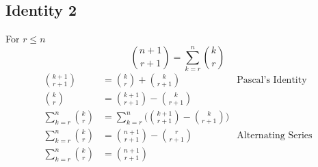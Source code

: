 \documentclass{article}
\theoremstyle{mytheoremstyle}
\theoremstyle{mytheoremstyle}
\theoremstyle{myproblemstyle}
\begin{document}
    \subsection*{Identity 2}
    For $r \le n$
    \[
        \binom{n+1}{r+1} = \sum_{k=r}^{n} \binom{k}{r}
    \]
    \begin{align*}
        \binom{k+1}{r+1} &= \binom{k}{r} + \binom{k}{r+1} & \text{Pascal's Identity} \\
        \binom{k}{r} &= \binom{k+1}{r+1} - \binom{k}{r+1} \\
        \sum_{k=r}^{n} \binom{k}{r} &= \sum_{k=r}^{n} \Bigg( \binom{k+1}{r+1} - \binom{k}{r+1}\Bigg) \\
        \sum_{k=r}^{n} \binom{k}{r} &= \binom{n+1}{r+1} - \binom{r}{r+1} & \text{Alternating Series} \\
        \sum_{k=r}^{n} \binom{k}{r} &= \binom{n+1}{r+1}
    \end{align*}
\end{document}
